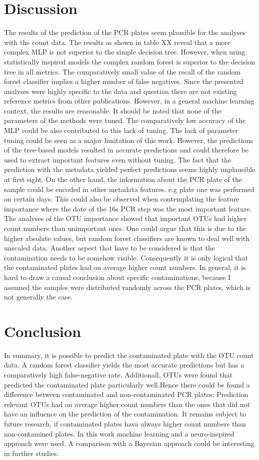 \documentclass{svproc}
\begin{document}
\section{Discussion}
The results of the prediction of the PCR plates seem plausible for the analyses with the count data. The results as shown in table XX reveal that a more complex MLP is not superior to the simple decision tree. However, when using statistically inspired models the complex random forest is superior to the decision tree in all metrics. The comparatively small value of the recall of the random forest classifier implies a higher number of false negatives. Since the presented analyses were highly specific to the data and question there are not existing reference metrics from other publications. However, in a general machine learning context, the results are reasonable. It should be noted that none of the parameters of the methods were tuned. The comparatively low accuracy of the MLP could be also contributed to this lack of tuning. The lack of parameter tuning could be seen as a major limitation of this work. However, the predictions of the tree-based models resulted in accurate predictions and could therefore be used to extract important features even without tuning.
The fact that the prediction with the metadata yielded perfect predictions seems highly unplausible at first sight. On the other hand, the information about the PCR plate of the sample could be encoded in other metadata features. e.g plate one was performed on certain days. This could also be observed when contemplating the feature importance where the date of the 16s PCR step was the most important feature.
The analyses of the OTU importance showed that important OTUs had higher count numbers than unimportant ones. One could argue that this is due to the higher absolute values, but random forest classifiers are known to deal well with unscaled data. Another aspect that have to be considered is that the contamination needs to be somehow visible. Consequently it is only logical that the contaminated plates had on average higher count numbers.
 In general, it is hard to draw a causal conclusion about specific contaminations, because I assumed the samples were distributed randomly across the PCR plates, which is not generally the case.
  
%
%
\section{Conclusion}
%
In summary, it is possible to predict the contaminated plate with the OTU count data. A random forest classifier yields the most accurate predictions but has a comparatively high false-negative rate. Additionall, OTUs were found that predicted the contaminated plate particularly well.Hence there could be found a difference between contaminated and non-contaminated PCR plates: Prediction relevant OTUs had on average higher count numbers than the ones that did not have an influence on the prediction of the contamination. It remains subject to future research, if contaminated plates hava always higher count numbers than non-contamined plates. In this work machine learning and a neuro-inspired approach were used. A comparison with a Bayesian approach could be interesting in further studies.

%
%
%


\end{document}
